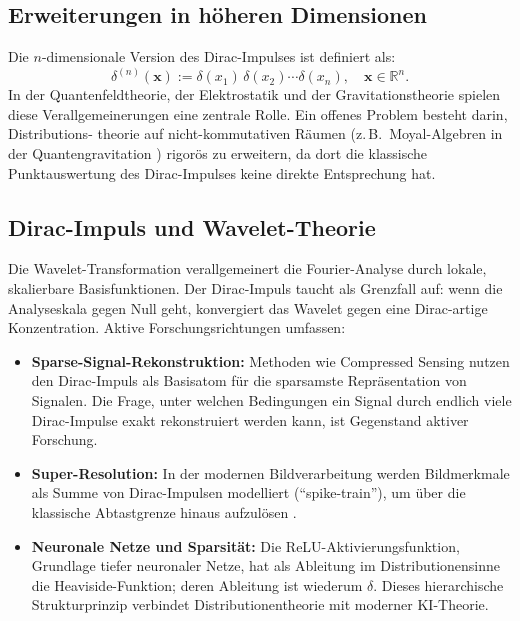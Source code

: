 ﻿\documentclass[a4paper,12pt]{article}
\theoremstyle{definition}
\begin{document}
\subsection{Erweiterungen in h\"oheren Dimensionen}

Die $n$-dimensionale Version des Dirac-Impulses ist definiert als:
\[
\delta^{(n)}(\mathbf{x}) := \delta(x_1)\,\delta(x_2)\cdots\delta(x_n),
\quad \mathbf{x} \in \mathbb{R}^n.
\]
In der Quantenfeldtheorie, der Elektrostatik und der Gravitationstheorie spielen diese
Verallgemeinerungen eine zentrale Rolle. Ein offenes Problem besteht darin, Distributions-
theorie auf nicht-kommutativen R\"aumen (z.\,B.\ Moyal-Algebren in der Quantengravitation
\cite{noncommutative_qg}) rigor\"os zu erweitern, da dort die klassische Punktauswertung
des Dirac-Impulses keine direkte Entsprechung hat.

\subsection{Dirac-Impuls und Wavelet-Theorie}

Die Wavelet-Transformation \cite{daubechies1992wavelets} verallgemeinert die Fourier-Analyse
durch lokale, skalierbare Basisfunktionen. Der Dirac-Impuls taucht als Grenzfall auf:
wenn die Analyseskala gegen Null geht, konvergiert das Wavelet gegen eine Dirac-artige
Konzentration. Aktive Forschungsrichtungen umfassen:
\begin{itemize}
    \item \textbf{Sparse-Signal-Rekonstruktion:} Methoden wie Compressed Sensing
          \cite{candes2006compressive} nutzen den Dirac-Impuls als Basisatom f\"ur
          die sparsamste Repr\"asentation von Signalen. Die Frage, unter welchen Bedingungen
          ein Signal durch endlich viele Dirac-Impulse exakt rekonstruiert werden kann,
          ist Gegenstand aktiver Forschung.
    \item \textbf{Super-Resolution:} In der modernen Bildverarbeitung werden Bildmerkmale
          als Summe von Dirac-Impulsen modelliert (``spike-train''), um \"uber die klassische
          Abtastgrenze hinaus aufzul\"osen \cite{candes2014towards}.
    \item \textbf{Neuronale Netze und Sparsit\"at:} Die ReLU-Aktivierungsfunktion,
          Grundlage tiefer neuronaler Netze, hat als Ableitung im Distributionensinne die
          Heaviside-Funktion; deren Ableitung ist wiederum $\delta$. Dieses hierarchische
          Strukturprinzip verbindet Distributionentheorie mit moderner KI-Theorie.
\end{itemize}
\end{document}
